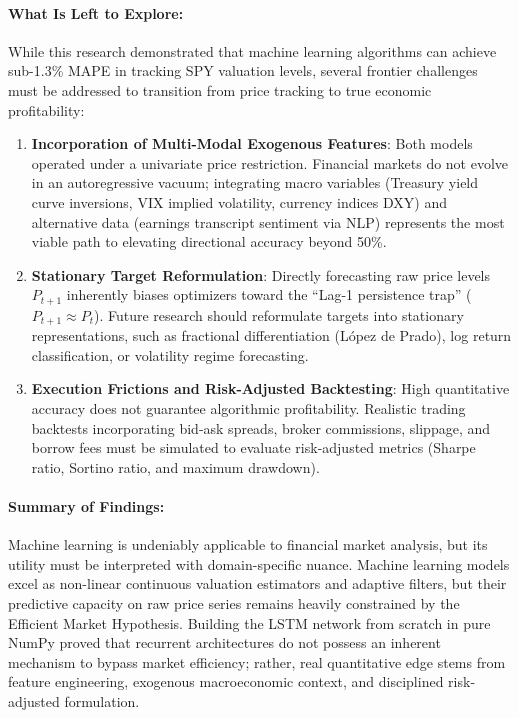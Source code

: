 \documentclass[11pt,letterpaper]{article}
\begin{document}
\paragraph{What Is Left to Explore:}
While this research demonstrated that machine learning algorithms can achieve sub-1.3\% MAPE in tracking SPY valuation levels, several frontier challenges must be addressed to transition from price tracking to true economic profitability:
\begin{enumerate}[leftmargin=*,itemsep=3pt,topsep=3pt]
    \item \textbf{Incorporation of Multi-Modal Exogenous Features}: Both models operated under a univariate price restriction. Financial markets do not evolve in an autoregressive vacuum; integrating macro variables (Treasury yield curve inversions, VIX implied volatility, currency indices DXY) and alternative data (earnings transcript sentiment via NLP) represents the most viable path to elevating directional accuracy beyond 50\%.
    \item \textbf{Stationary Target Reformulation}: Directly forecasting raw price levels $P_{t+1}$ inherently biases optimizers toward the ``Lag-1 persistence trap'' ($P_{t+1} \approx P_t$). Future research should reformulate targets into stationary representations, such as fractional differentiation (López de Prado), log return classification, or volatility regime forecasting.
    \item \textbf{Execution Frictions and Risk-Adjusted Backtesting}: High quantitative accuracy does not guarantee algorithmic profitability. Realistic trading backtests incorporating bid-ask spreads, broker commissions, slippage, and borrow fees must be simulated to evaluate risk-adjusted metrics (Sharpe ratio, Sortino ratio, and maximum drawdown).
\end{enumerate}

\paragraph{Summary of Findings:}
Machine learning is undeniably applicable to financial market analysis, but its utility must be interpreted with domain-specific nuance. Machine learning models excel as non-linear continuous valuation estimators and adaptive filters, but their predictive capacity on raw price series remains heavily constrained by the Efficient Market Hypothesis. Building the LSTM network from scratch in pure NumPy proved that recurrent architectures do not possess an inherent mechanism to bypass market efficiency; rather, real quantitative edge stems from feature engineering, exogenous macroeconomic context, and disciplined risk-adjusted formulation.
\end{document}
